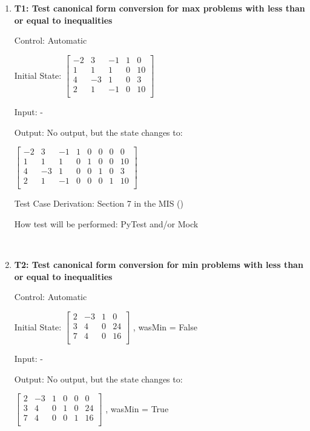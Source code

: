 \documentclass[12pt, titlepage]{article}
\begin{document}
\begin{enumerate}
		
	\item{\textbf{T1: Test canonical form conversion for max problems with less 
	than or equal to inequalities}}
		
	Control: Automatic 
		
	Initial State: $\begin{bmatrix}
	-2 & 3 & -1 & 1 & 0\\
	1 & 1 & 1 & 0 & 10\\
	4 & -3 & 1 & 0 & 3\\
	2 & 1 & -1 & 0 & 10\\
	\end{bmatrix}$
		
	Input: -
		
	Output: No output, but the state changes to:
	
	$\begin{bmatrix}
	-2 & 3 & -1 & 1 & 0 & 0 & 0 & 0\\
	1 & 1 & 1 & 0 & 1 & 0 & 0 & 10\\
	4 & -3 & 1 & 0 & 0 & 1 & 0 & 3\\
	2 & 1 & -1 & 0 & 0 & 0 & 1 & 10\\
	\end{bmatrix}$
	
	Test Case Derivation: Section 7 in the MIS (\cite{losms-mis})
		
	How test will be performed: PyTest and/or Mock
	
	 \\

	\item{\textbf{T2: Test canonical form conversion for min problems with less 
			than or equal to inequalities}}
	
	Control: Automatic 
	
	Initial State: $\begin{bmatrix}
	2 & -3 & 1 & 0\\
	3 & 4 & 0 & 24\\
	7 & 4 & 0 & 16\\
	\end{bmatrix}$ , wasMin = False
	
	Input: -
	
	Output: No output, but the state changes to:
	
	$\begin{bmatrix}
	2 & -3 & 1 & 0 & 0 & 0\\
	3 & 4 & 0 & 1 & 0 & 24\\
	7 & 4 & 0 & 0 & 1 & 16\\
	\end{bmatrix}$ , wasMin = True
	

\end{enumerate}
\end{document}
